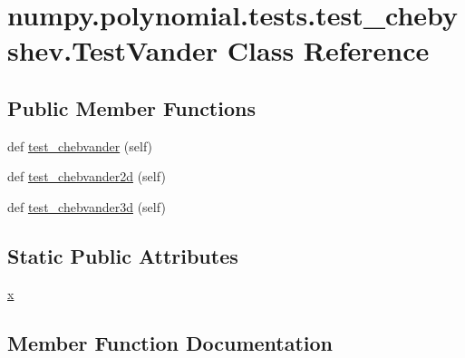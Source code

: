 \hypertarget{classnumpy_1_1polynomial_1_1tests_1_1test__chebyshev_1_1TestVander}{}\section{numpy.\+polynomial.\+tests.\+test\+\_\+chebyshev.\+Test\+Vander Class Reference}
\label{classnumpy_1_1polynomial_1_1tests_1_1test__chebyshev_1_1TestVander}
\subsection*{Public Member Functions}
\begin{DoxyCompactItemize}
\item 
def \hyperlink{classnumpy_1_1polynomial_1_1tests_1_1test__chebyshev_1_1TestVander_a03cb54b278a7a460b9c2aab092035124}{test\+\_\+chebvander} (self)
\item 
def \hyperlink{classnumpy_1_1polynomial_1_1tests_1_1test__chebyshev_1_1TestVander_a29db4be40fa30d898b92b4ceb38dd7be}{test\+\_\+chebvander2d} (self)
\item 
def \hyperlink{classnumpy_1_1polynomial_1_1tests_1_1test__chebyshev_1_1TestVander_ac38c057d39f58dfdaffd42007dfacd9d}{test\+\_\+chebvander3d} (self)
\end{DoxyCompactItemize}
\subsection*{Static Public Attributes}
\begin{DoxyCompactItemize}
\item 
\hyperlink{classnumpy_1_1polynomial_1_1tests_1_1test__chebyshev_1_1TestVander_a42b983bcafda009c052e07043fabb262}{x}
\end{DoxyCompactItemize}


\subsection{Member Function Documentation}
\mbox{\label{classnumpy_1_1polynomial_1_1tests_1_1test__chebyshev_1_1TestVander_a03cb54b278a7a460b9c2aab092035124}} 
